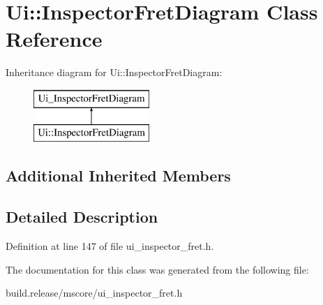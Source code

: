 \hypertarget{class_ui_1_1_inspector_fret_diagram}{}\section{Ui\+:\+:Inspector\+Fret\+Diagram Class Reference}
\label{class_ui_1_1_inspector_fret_diagram}
Inheritance diagram for Ui\+:\+:Inspector\+Fret\+Diagram\+:\begin{figure}[H]
\begin{center}
\leavevmode
\includegraphics[height=2.000000cm]{class_ui_1_1_inspector_fret_diagram}
\end{center}
\end{figure}
\subsection*{Additional Inherited Members}


\subsection{Detailed Description}


Definition at line 147 of file ui\+\_\+inspector\+\_\+fret.\+h.



The documentation for this class was generated from the following file\+:\begin{DoxyCompactItemize}
\item 
build.\+release/mscore/ui\+\_\+inspector\+\_\+fret.\+h\end{DoxyCompactItemize}
